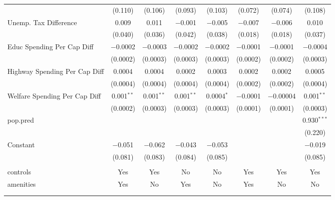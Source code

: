 \begin{table}[!htbp]
\begin{tabular}{@{\extracolsep{5pt}}lccccccc}
  & (0.110) & (0.106) & (0.093) & (0.103) & (0.072) & (0.074) & (0.108) \\ 
  Unemp. Tax Difference & 0.009 & 0.011 & $-$0.001 & $-$0.005 & $-$0.007 & $-$0.006 & 0.010 \\ 
  & (0.040) & (0.036) & (0.042) & (0.038) & (0.018) & (0.018) & (0.037) \\ 
  Educ Spending Per Cap Diff & $-$0.0002 & $-$0.0003 & $-$0.0002 & $-$0.0002 & $-$0.0001 & $-$0.0001 & $-$0.0004 \\ 
  & (0.0002) & (0.0003) & (0.0003) & (0.0003) & (0.0002) & (0.0002) & (0.0003) \\ 
  Highway Spending Per Cap Diff & 0.0004 & 0.0004 & 0.0002 & 0.0003 & 0.0002 & 0.0002 & 0.0005 \\ 
  & (0.0004) & (0.0004) & (0.0004) & (0.0004) & (0.0002) & (0.0002) & (0.0004) \\ 
  Welfare Spending Per Cap Diff & 0.001$^{**}$ & 0.001$^{**}$ & 0.001$^{**}$ & 0.0004$^{*}$ & $-$0.0001 & $-$0.00004 & 0.001$^{**}$ \\ 
  & (0.0002) & (0.0003) & (0.0003) & (0.0003) & (0.0001) & (0.0001) & (0.0003) \\ 
  pop.pred &  &  &  &  &  &  & 0.930$^{***}$ \\ 
  &  &  &  &  &  &  & (0.220) \\ 
  Constant & $-$0.051 & $-$0.062 & $-$0.043 & $-$0.053 &  &  & $-$0.019 \\ 
  & (0.081) & (0.083) & (0.084) & (0.085) &  &  & (0.085) \\ 
 \hline \\[-1.8ex] 
controls & Yes & Yes & No & No & Yes & Yes & Yes \\ 
amenities & Yes & No & Yes & No & Yes & No & No \\ 
\hline \\[-1.8ex] 
\hline 
\hline \\[-1.8ex] 
\end{tabular} 
\end{table} 
